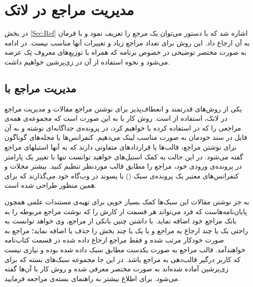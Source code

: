 %
    
\chapter{مدیریت مراجع در لاتک}\label{App:RefMan}
\thispagestyle{empty}

در بخش \ref{Sec:Ref} اشاره شد که با دستور 
  می‌توان یک مرجع را تعریف نمود و با فرمان
  به آن ارجاع داد. این روش برای تعداد مراجع زیاد و تغییرات آنها مناسب نیست. در ادامه به صورت مختصر توضیحی در خصوص برنامه  که همراه با توزیع‌های معروف تِک عرضه می‌شود و نحوه استفاده از آن در زی‌پرشین خواهیم داشت.

\section{ مدیریت مراجع با  \texorpdfstring{}{Bib\TeX} }
یکی از روش‌های قدرتمند و انعطاف‌پذیر برای نوشتن مراجع مقالات و مدیریت مراجع در لاتک، استفاده از   است.
 روش کار با   به این صورت است که مجموعه‌ی همه‌ی مراجعی را که در \پ استفاده کرده یا خواهیم کرد، 
در پرونده‌ی جداگانه‌ای نوشته و به آن فایل در سند خودمان به صورت مناسب لینک می‌دهیم.
 کنفرانس‌ها یا مجله‌های گوناگون برای نوشتن مراجع، قالب‌ها یا قراردادهای متفاوتی دارند که به آنها استیلهای مراجع گفته می‌شود.
 در این حالت به کمک ‌استیل‌های  خواهید توانست تنها با تغییر یک پارامتر در پرونده‌ی ورودی خود، مراجع را مطابق قالب موردنظر تنظیم کنید. 
 بیشتر مجلات و کنفرانس‌های معتبر یک پرونده‌ی سبک () با پسوند  در وب‌گاه خود می‌گذارند که برای همین منظور طراحی شده است.

به جز نوشتن مقالات این سبک‌ها کمک بسیار خوبی برای تهیه‌ی مستندات علمی همچون پایان‌نامه‌هاست که فرد می‌تواند هر قسمت از کارش را که نوشت مراجع مربوطه را به بانک مراجع خود اضافه نماید. با داشتن چنین بانکی از مراجع، وی خواهد توانست به راحتی یک یا چند ارجاع به مراجع و یا یک یا چند بخش را حذف یا اضافه ‌نماید؛ 
مراجع به صورت خودکار مرتب شده و فقط مراجع ارجاع داده شده در قسمت کتاب‌نامه خواهندآمد. قالب مراجع به صورت یکدست مطابق سبک داده شده بوده و نیازی نیست که کاربر درگیر قالب‌دهی به مراجع باشد. 
در این جا مجموعه‌ سبک‌های بسته  که برای  زی‌پرشین آماده شده‌اند به صورت مختصر معرفی شده و روش کار با آن‌ها گفته می‌شود. برای اطلاع بیشتر به راهنمای بسته‌ی  مراجعه فرمایید.
